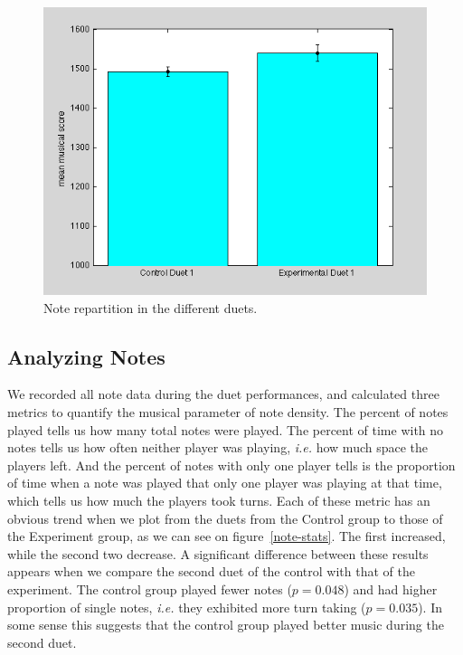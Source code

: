 \documentclass{article}
\begin{document}
\begin{figure}[tb]
\includegraphics[width=\columnwidth]{music-scores-bar-graph.png}
\caption{Note repartition in the different duets.} 
\label{survey-results}
\end{figure}


\subsection{Analyzing Notes}

We recorded all note data during the duet performances, and calculated three metrics to quantify the musical parameter of note density. The percent of notes played tells us how many total notes were played. The percent of time with no notes tells us how often neither player was playing, \emph{i.e.} how much space the players left. And the percent of notes with only one player tells is the proportion of time when a note was played that only one player was playing at that time, which tells us how much the players took turns. Each of these metric has an obvious trend when we plot from the duets from the Control group to those of the Experiment group, as we can see on figure~\ref{note-stats}. The first increased, while the second two decrease. A significant difference between these results appears when we compare the second duet of the control with that of the experiment. The control group played fewer notes ($p = 0.048$) and had higher proportion of single notes, \emph{i.e.} they exhibited more turn taking ($p = 0.035$). In some sense this suggests that the control group played better music during the second duet. 
\end{document}
